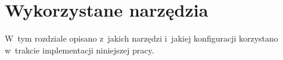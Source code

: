 \documentclass[thesis]{subfiles}
\begin{document}
%
%
%
%
%
%
%
%
%
%
%
%
%


\section{Wykorzystane narzędzia}

W~tym rozdziale opisano z~jakich narzędzi i~jakiej konfiguracji korzystano w~trakcie implementacji niniejszej pracy.
\end{document}
